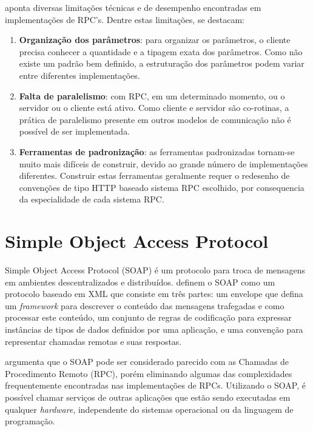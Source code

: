  aponta diversas limitações técnicas e de desempenho encontradas em implementações de RPC's. Dentre estas limitações, se destacam:

\begin{enumerate}[label=\alph*)]

\item \textbf{Organização dos parâmetros}: para organizar os parâmetros, o cliente precisa conhecer a quantidade e a tipagem exata dos parâmetros. Como não existe um padrão bem definido, a estruturação dos parâmetros podem variar entre diferentes implementações.

\item \textbf{Falta de paralelismo}: com RPC, em um determinado momento, ou o servidor ou o cliente está ativo. Como cliente e servidor são co-rotinas, a prática de paralelismo presente em outros modelos de comunicação não é possível de ser implementada.

\item \textbf{Ferramentas de padronização}: as ferramentas padronizadas tornam-se muito mais difíceis de construir, devido ao grande número de implementações diferentes. Construir estas ferramentas geralmente requer o redesenho de convenções de tipo HTTP baseado sistema RPC escolhido, por consequencia da especialidade de cada sistema RPC.

\end{enumerate}

\section{Simple Object Access Protocol}\label{sec:soap}

Simple Object Access Protocol (SOAP) é um protocolo para troca de mensagens em ambientes descentralizados e distribuídos.  definem o SOAP como 
um protocolo baseado em XML que consiste em três partes: um envelope que defina um \textit{framework} para descrever o conteúdo das mensagens trafegadas e como processar este conteúdo, um conjunto de regras de codificação para expressar instâncias de tipos de dados definidos por uma aplicação, e uma convenção para representar chamadas remotas e suas respostas.

 argumenta que o SOAP pode ser considerado parecido com as Chamadas de Procedimento Remoto (RPC), porém eliminando algumas das complexidades frequentemente encontradas nas implementações de RPCs. Utilizando o SOAP, é possível chamar serviços de outras aplicações que estão sendo executadas em qualquer \textit{hardware}, independente do sistemas operacional ou da linguagem de programação.

